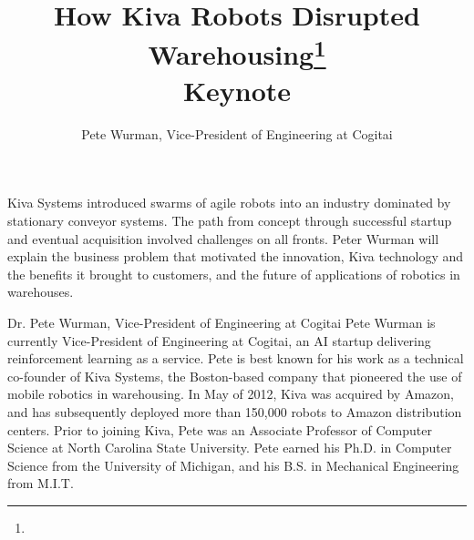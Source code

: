 \documentclass{article}
\title{How Kiva Robots Disrupted Warehousing\footnote{\protect}\\
\vspace{0.2in}
\large{
Keynote
}}
\author{Pete Wurman, Vice-President of Engineering at Cogitai
}
\begin{document}
\maketitle

Kiva Systems introduced swarms of agile robots into an industry
dominated by stationary conveyor systems. The path from concept
through successful startup and eventual acquisition involved challenges
on all fronts. Peter Wurman will explain the business problem that motivated
the innovation, Kiva technology and the benefits it brought to
customers, and the future of applications of robotics in warehouses.

Dr. Pete Wurman, Vice-President of Engineering at Cogitai
Pete Wurman is currently Vice-President of Engineering at Cogitai, an AI
startup delivering reinforcement learning as a service. Pete is best
known for his work as a technical co-founder of Kiva Systems, the
Boston-based company that pioneered the use of mobile robotics in
warehousing. In May of 2012, Kiva was acquired by Amazon, and has
subsequently deployed more than 150,000 robots to Amazon
distribution centers. Prior to joining Kiva, Pete was an Associate
Professor of Computer Science at North Carolina State University. Pete
earned his Ph.D. in Computer Science from the University of Michigan,
and his B.S. in Mechanical Engineering from M.I.T.
\end{document}
